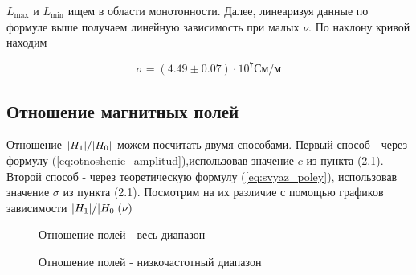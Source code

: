 \documentclass{article}
\begin{document}
\vspace{1cm}
$L_{\max}$ и $L_{\min}$ ищем в области монотонности. Далее, линеаризуя данные по формуле
выше получаем линейную зависимость при малых $\nu$. По наклону кривой находим

\begin{equation}
    \sigma = (4.49 \pm 0.07) \cdot 10^7 См/м
\end{equation}

\newpage

\subsection{Отношение магнитных полей}
Отношение $\abs{H_1}/\abs{H_0}$ можем посчитать двумя способами. Первый способ - через
формулу (\ref{eq:otnoshenie_amplitud}),использовав значение $c$ из пункта (2.1).
Второй способ - через теоретическую формулу (\ref{eq:svyaz_poley}), использовав значение
$\sigma$ из пункта (2.1). Посмотрим на их различие с помощью графиков зависимости
$\abs{H_1}/\abs{H_0} (\nu)$

\begin{figure}[h]
    \caption{Отношение полей - весь диапазон}\label{fig:all_freq_ratio}
    \caption{Отношение полей - низкочастотный диапазон}\label{fig:low_freq_ratio}
    \newpage
\end{figure}
\end{document}
